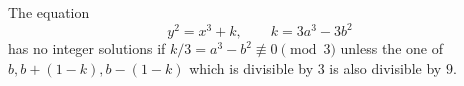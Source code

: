 \begin{proposition}
    The equation
\[
    y^2=x^3+k,\qquad k=3a^3-3b^2
\]
    has no integer solutions if $k/3=a^3-b^2\not\equiv0\pmod3$ unless the one of $b,b+(1-k),b-(1-k)$ which is divisible by $3$ is also divisible by $9$.
\end{proposition}
